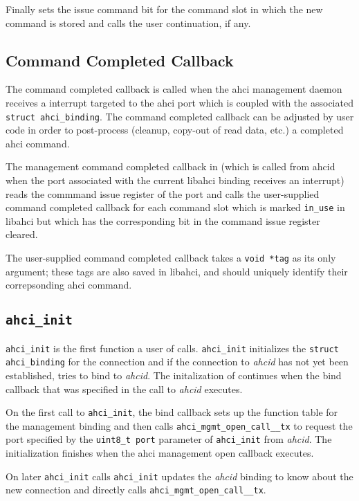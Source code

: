 Finally \issuecmd sets the issue command bit for the command slot in which the
new command is stored and calls the user continuation, if any.

\subsection{Command Completed Callback}

The command completed callback is called when the \ac{ahci} management daemon
receives a interrupt targeted to the \ac{ahci} port which is coupled with the
associated \lstinline+struct ahci_binding+. The command completed callback can
be adjusted by user code in order to post-process (cleanup, copy-out of read
data, etc.) a completed \ac{ahci} command.

The management command completed callback in \libahci (which is called from
ahcid when the port associated with the current libahci binding receives an
interrupt) reads the commmand issue register of the port and calls the
user-supplied command completed callback for each command slot which is marked
\lstinline+in_use+ in libahci but which has the corresponding bit in the
command issue register cleared.

The user-supplied command completed callback takes a \lstinline+void *tag+ as
its only argument; these tags are also saved in libahci, and should uniquely
identify their correpsonding \ac{ahci} command.

\newcommand{\ahciinit}{\lstinline+ahci_init+\xspace}
\subsection[ahci\_init]{\lstinline+ahci_init+}

\ahciinit is the first function a user of \libahci calls. \ahciinit initializes
the \lstinline+struct ahci_binding+ for the connection and if the connection to
\emph{ahcid} has not yet been established, tries to bind to \emph{ahcid}.  The
initalization of \libahci continues when the bind callback that was specified
in the call to \emph{ahcid} executes.

On the first call to \ahciinit, the bind callback sets up the function table
for the management binding and then calls \lstinline+ahci_mgmt_open_call__tx+
to request the port specified by the \lstinline+uint8_t port+ parameter of
\ahciinit from \emph{ahcid}. The initialization finishes when the ahci
management open callback executes.

On later \ahciinit calls \ahciinit updates the \emph{ahcid} binding to know
about the new \libahci connection and directly calls
\lstinline+ahci_mgmt_open_call__tx+.


